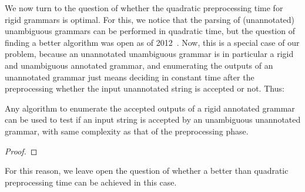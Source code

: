 We now turn to the question of whether the quadratic preprocessing time for
rigid grammars is optimal. For this, we notice that the parsing of
(unannotated) unambiguous grammars can be performed in quadratic time, but the
question of finding a better algorithm was open as of
2012~\cite{schmitz2012can}. Now, this is a special case of our problem, because
an unannotated unambiguous grammar is in particular a rigid and unambiguous
annotated grammar, and enumerating the outputs of an unannotated grammar just
means deciding in constant time after the preprocessing whether the input
unannotated string is accepted or not. Thus:

\begin{proposition}\label{gram:prp:redunann}
  Any algorithm to enumerate the accepted outputs of a rigid
  annotated grammar can be used to test if an input string is accepted by an
  unambiguous unannotated grammar, with same complexity as that of the
  preprocessing phase.
\end{proposition}
\begin{proof}
  
\end{proof}

For this reason, we leave open the question of whether a better than quadratic
preprocessing time can be achieved in this case.

